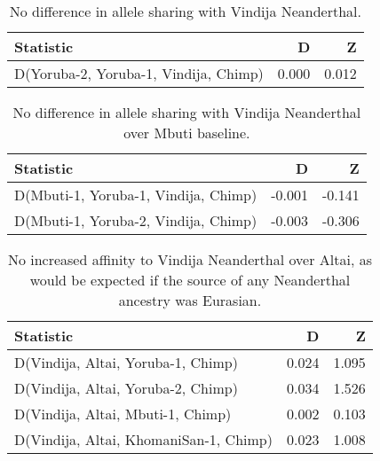 \begin{table}[ht]
\centering
\begin{tabular}{lrr}
  \hline
Statistic & D & Z \\ 
  \hline
D(Yoruba-2, Yoruba-1, Vindija, Chimp) & 0.000 & 0.012 \\ 
   \hline
\end{tabular}
\caption{No difference in allele sharing with Vindija Neanderthal.} 
\label{dstats:a4}
\end{table}
\begin{table}[ht]
\centering
\begin{tabular}{lrr}
  \hline
Statistic & D & Z \\ 
  \hline
D(Mbuti-1, Yoruba-1, Vindija, Chimp) & -0.001 & -0.141 \\ 
  D(Mbuti-1, Yoruba-2, Vindija, Chimp) & -0.003 & -0.306 \\ 
   \hline
\end{tabular}
\caption{No difference in allele sharing with Vindija Neanderthal over Mbuti baseline.} 
\label{dstats:a5}
\end{table}
\begin{table}[ht]
\centering
\begin{tabular}{lrr}
  \hline
Statistic & D & Z \\ 
  \hline
D(Vindija, Altai, Yoruba-1, Chimp) & 0.024 & 1.095 \\ 
  D(Vindija, Altai, Yoruba-2, Chimp) & 0.034 & 1.526 \\ 
  D(Vindija, Altai, Mbuti-1, Chimp) & 0.002 & 0.103 \\ 
  D(Vindija, Altai, KhomaniSan-1, Chimp) & 0.023 & 1.008 \\ 
   \hline
\end{tabular}
\caption{No increased affinity to Vindija Neanderthal over Altai, as would be expected if the source of any Neanderthal ancestry was Eurasian.} 
\label{dstats:a6}
\end{table}
